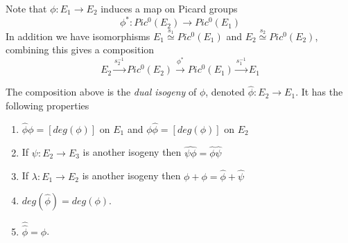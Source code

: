 Note that $\phi: E_1 \rightarrow E_2$ induces a map on Picard groups
$$\phi^*: Pic^0(E_2) \rightarrow Pic^0(E_1)$$
In addition we have isomorphisms $E_1 \overset{s_1}{\simeq} Pic^0(E_1)$ and 
$E_2 \overset{s_2}{\simeq} Pic^0(E_2)$, combining this gives a composition
$$ E_2 \overset{s_2^{-1}}{\rightarrow} Pic^0(E_2) \overset{\phi^*}{\rightarrow} Pic^0(E_1)
\overset{s_1^{-1}}{\rightarrow} E_1 $$

\begin{prop}
 The composition above is the \emph{dual isogeny} of $\phi$, denoted $\widehat{\phi}: E_2 \rightarrow E_1$.
It has the following properties 
\begin{enumerate}
 \item $\widehat{\phi}\phi = [deg(\phi)]$ on $E_1$ and $\phi\widehat{\phi} = [deg(\phi)]$ on $E_2$
 \item If $\psi: E_2 \rightarrow E_3$ is another isogeny then $\widehat{\psi \phi} = \widehat{\phi}\widehat{\psi}$
 \item If $\lambda: E_1 \rightarrow E_2$ is another isogeny then $\widehat{\phi+\phi} = \widehat{\phi}+\widehat{\psi}$
 \item $deg(\widehat{\phi}) = deg(\phi)$.
 \item $\widehat{\widehat{\phi}} = \phi$.
\end{enumerate}

\end{prop}
